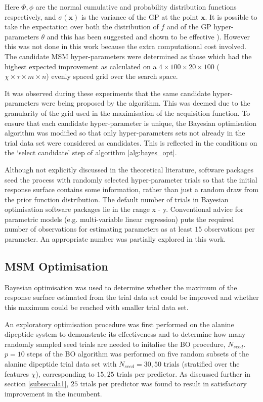 Here $\Phi, \phi$ are the normal cumulative and probability distribution functions respectively, and $\sigma(\mathbf{x})$ is the variance of the GP at the point $\mathbf{x}$. It is possible to take the expectation over both the distribution of $f$ and of the GP hyper-parameters $\theta$ and this has been suggested and shown to be effective \cite{NIPS2012_4522}). However this was not done in this work because the extra computational cost involved. The candidate MSM hyper-parameters were determined as those which had the highest expected improvement as calculated on a $4 \times 100 \times 20 \times 100$ ($\chi \times \tau \times m \times n$) evenly spaced grid over the search space.

It was observed during these experiments that the same candidate hyper-parameters were being proposed by the algorithm. This was deemed due to the granularity of the grid used in the maximisation of the acquisition function. To ensure that each candidate hyper-parameter is unique, the Bayesian optimisation algorithm was modified so that only  hyper-parameters sets not already in the trial data set were considered as candidates. This is reflected in the conditions on the `select candidate' step of algorithm \ref{alg:bayes_opt}.

Although not explicitly discussed in the theoretical literature, software packages seed the process with randomly selected hyper-parameter trials so that the initial response surface contains some information, rather than just a random draw from the prior function distribution. The default number of trials in Bayesian optimisation software packages lie in the range x - y. Conventional advice \cite{harrelRegressionModelingStrategies2015} for parametric models (e.g. multi-variable linear regression) puts the required number of observations for estimating parameters as at least $15$ observations per parameter. An appropriate number was partially explored in this work. 

\subsection{MSM Optimisation}
Bayesian optimisation was used to determine whether the maximum of the response surface estimated from the trial data set could be improved and whether this maximum could be reached with smaller trial data set.

An exploratory optimisation procedure was first performed on the alanine dipeptide system to demonstrate its effectiveness and to determine how many randomly sampled seed trials are needed to initalise the BO procedure, $N_{seed}$. $p=10$ steps of the BO algorithm was performed on five random subsets of the alanine dipeptide trial data set with $N_{seed}=30, 50$ trials (stratified over the features $\chi$), corresponding to $15, 25$ trials per predictor. As discussed further in section \ref{subsec:ala1}, $25$ trials per predictor was found to result in satisfactory improvement in the incumbent.  

